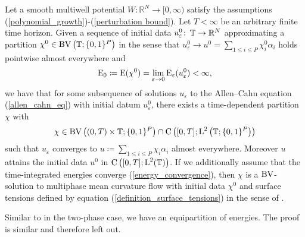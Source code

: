 \begin{theorem}
	\label{convergence_to_multiphase_mcf}
	Let a smooth multiwell potential $ W \colon \mathbb{ R }^{ N } \to [ 0, 
	\infty ) $ satisfy the assumptions 
	(\ref{polynomial_growth})-(\ref{perturbation bound}). Let $ T < \infty 
	$ be an arbitrary finite time horizon. Given a sequence of initial data 
	$ u_{ \varepsilon }^{ 0 } \colon \operatorname{\mathbb{T}} \to \mathbb{ R }^{ N } $ 
	approximating a partition 
	$ \chi^{ 0 } \in \operatorname{BV} \left( \operatorname{\mathbb{T}} ; \{ 0 , 1 \}^{ P } \right) $ 
	in the sense that 
	$ u_{ \varepsilon }^{ 0 } \to u^{ 0 } =  \sum_{ 1 \leq i \leq P } 
	\chi_{ i }^{ 0 } \alpha_{ i } $ 
	holds pointwise almost everywhere and 
	\begin{equation*} 
		\operatorname{E}_{ 0 } 
		\coloneqq 
		\operatorname{E} ( \chi^{ 0 } ) 
		= 
		\lim_{ \varepsilon \to 0 } 
		\operatorname{E}_{ \varepsilon } ( u_{ \varepsilon }^{ 0 } ) 
		< 
		\infty,
	\end{equation*}
	we have that for 
	some subsequence of solutions $ u_{\varepsilon } $ to the Allen--Cahn 
	equation
	(\ref{allen_cahn_eq}) with initial datum $ u_{ 
		\varepsilon }^{ 0 } $, there exists a time-dependent partition $ \chi $ 
	with 
	\begin{equation*}
	\chi \in \operatorname{BV} \left( ( 0 , T ) \times \operatorname{\mathbb{T}} ; \{ 0 , 1 \}^{ P } 
	\right) \cap \operatorname{C} \left( [ 0 , T ] ; \operatorname{L}^{ 2 } \left( \operatorname{\mathbb{T}} ;  \{ 0 , 
	1 
	\}^{ P } \right) \right)
	\end{equation*}
	 such that $ u_{ \varepsilon } $ converges to 
	$ u \coloneqq \sum_{ 1 \leq i \leq P } \chi_{ i } \alpha_{ i } $ almost 
	everywhere. Moreover $ u $ attains the initial data $ u^{ 0 } $ in $ 
	\operatorname{C} \left( [ 0, T ] ; \operatorname{L}^{ 2 }( \operatorname{\mathbb{T}} ) \right) $. If we 
	additionally assume that the 
	time-integrated energies converge (\ref{energy_convergence}), then $ 
	\chi $ is a $ \operatorname{BV} $-solution to multiphase mean curvature flow with initial 
	data $ \chi^{ 0 } $ and surface tensions defined by equation 
	(\ref{definition_surface_tensions}) in the sense of .
\end{theorem} 
Similar to  in the two-phase case, we have an 
equipartition of energies. The proof is similar and therefore left out.

